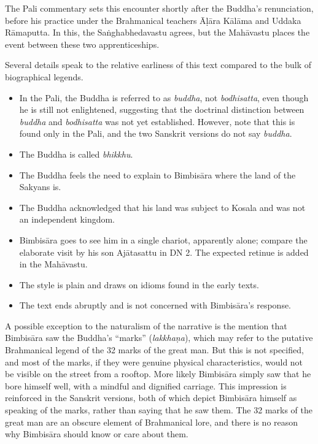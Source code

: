 \documentclass[12pt,openany]{book}%
\begin{document}
The Pali commentary sets this encounter shortly after the Buddha’s renunciation, before his practice under the Brahmanical teachers \textsanskrit{Āḷāra} \textsanskrit{Kālāma} and Uddaka \textsanskrit{Rāmaputta}. In this, the \textsanskrit{Saṅghabhedavastu} agrees, but the \textsanskrit{Mahāvastu} places the event between these two apprenticeships.

Several details speak to the relative earliness of this text compared to the bulk of biographical legends.

\begin{itemize}%
\item In the Pali, the Buddha is referred to as \textit{buddha}, not \textit{bodhisatta}, even though he is still not enlightened, suggesting that the doctrinal distinction between \textit{buddha} and \textit{bodhisatta} was not yet established. However, note that this is found only in the Pali, and the two Sanskrit versions do not say \textit{buddha}.%
\item The Buddha is called \textit{bhikkhu}.%
\item The Buddha feels the need to explain to \textsanskrit{Bimbisāra} where the land of the Sakyans is.%
\item The Buddha acknowledged that his land was subject to Kosala and was not an independent kingdom.%
\item \textsanskrit{Bimbisāra} goes to see him in a single chariot, apparently alone; compare the elaborate visit by his son \textsanskrit{Ajātasattu} in DN 2. The expected retinue is added in the \textsanskrit{Mahāvastu}.%
\item The style is plain and draws on idioms found in the early texts.%
\item The text ends abruptly and is not concerned with \textsanskrit{Bimbisāra}’s response.%
\end{itemize}

A possible exception to the naturalism of the narrative is the mention that \textsanskrit{Bimbisāra} saw the Buddha’s “marks” (\textit{\textsanskrit{lakkhaṇa}}), which may refer to the putative Brahmanical legend of the 32 marks of the great man. But this is not specified, and most of the marks, if they were genuine physical characteristics, would not be visible on the street from a rooftop. More likely \textsanskrit{Bimbisāra} simply saw that he bore himself well, with a mindful and dignified carriage. This impression is reinforced in the Sanskrit versions, both of which depict \textsanskrit{Bimbisāra} himself as speaking of the marks, rather than saying that he saw them. The 32 marks of the great man are an obscure element of Brahmanical lore, and there is no reason why \textsanskrit{Bimbisāra} should know or care about them.
\end{document}
